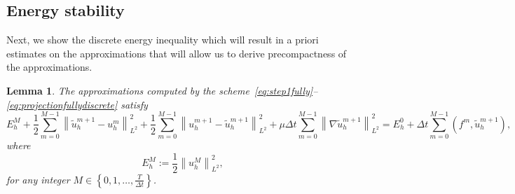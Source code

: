 \documentclass[10pt,letterpaper]{amsart}
\newcommand{\tu}{\widetilde{u}}
\newcommand\norm[1]{\left\lVert#1\right\rVert}
\newcommand{\Grad}{\nabla}
\newtheorem{lemma}{Lemma}[section]
\theoremstyle{definition}{\newtheorem{definition}[lemma]{Definition}}
\numberwithin{equation}{section}
\begin{document}
\subsection{Energy stability}
Next, we show the discrete energy inequality which will result in a priori estimates on the approximations that will allow us to derive precompactness of the approximations. 

\begin{lemma}
	\label{lem:discenergyestimate}
	The approximations computed by the scheme~\eqref{eq:step1fully}--\eqref{eq:projectionfullydiscrete} satisfy
	\begin{equation}\label{eq:discenergybalance}
	E^M_h	 
	 +\frac12\sum_{m=0}^{M-1}\norm{\tu_h^{m+1}-u^m_h}_{L^2}^2 
	+\frac12\sum_{m=0}^{M-1}\norm{u^{m+1}_h-\tu^{m+1}_h}^2_{L^2}+\mu\Delta t\sum_{m=0}^{M-1}\norm{\Grad \tu_h^{m+1}}_{L^2}^2
 = E^0_h + \Delta t \sum_{m=0}^{M-1}(  f^m,\tu_h^{m+1}),
	\end{equation}	
	where
	\begin{equation*}
	E^M_h := 	\frac{1}{2}\norm{u^{M}_h}_{L^2}^2,
	\end{equation*}
	for any integer $M\in \left\{0,1,\dots, \frac{T}{\Delta t}\right\}$.
\end{lemma}
%
%
%
%
\end{document}
